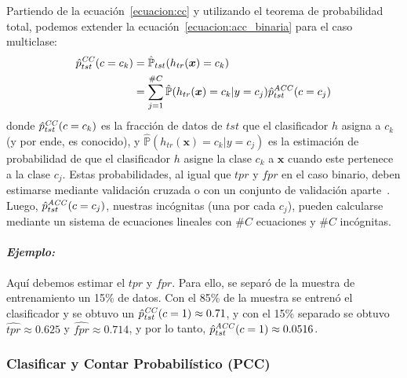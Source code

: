Partiendo de la ecuación~\ref{ecuacion:cc} y utilizando el teorema de
probabilidad total, podemos extender la ecuación~\ref{ecuacion:acc_binaria} para
el caso multiclase:
\begin{align}
\begin{split}
    \hat p^{\it CC\/}_{tst}(c=c_k) &= \mathbb{\hat P}_{tst}(h_{tr}(\boldsymbol{x})=c_k) \\
    &= \sum \limits_{j=1}^{\#C}{\mathbb{\hat P}(h_{tr}(\boldsymbol{x})=c_k|y=c_j) \hat p^{\it ACC\/}_{tst}(c=c_j)}\label{ecuacion:acc_multiclase}
\end{split}
\end{align}
donde \(\hat p^{\it CC\/}_{tst}(c=c_k)\) es la fracción de datos de \(tst\) que
el clasificador \(h\) asigna a \(c_k\) (y por ende, es conocido), y
\(\mathbb{\hat{P}}(h_{tr}(\boldsymbol{x})=c_k|y=c_j)\) es la estimación de
probabilidad de que el clasificador \(h\) asigne la clase \(c_k\) a
\(\boldsymbol{x}\) cuando este pertenece a la clase \(c_j\). Estas
probabilidades, al igual que \(tpr\) y \(fpr\) en el caso binario, deben
estimarse mediante validación cruzada o con un conjunto de validación
aparte~\cite{barranquero2013study, forman2005counting, forman2008quantifying}.
Luego, \(\hat p^{\it ACC\/}_{tst}(c=c_j)\), nuestras incógnitas (una por cada
\(c_j\)), pueden calcularse mediante un sistema de ecuaciones lineales con
\(\#C\) ecuaciones y \(\#C\) incógnitas.

\paragraph{\it Ejemplo:\/} Aquí debemos estimar el \(tpr\) y \(fpr\). Para ello,
se separó de la muestra de entrenamiento un 15\% de datos. Con el 85\% de la
muestra se entrenó el clasificador y se obtuvo un \(\hat p^{\it CC\/}_{tst}(c=1)
\approx 0.71\), y con el 15\% separado se obtuvo \(\hat{tpr} \approx 0.625\) y
\(\hat{fpr} \approx 0.714\), y por lo tanto, \(\hat p^{\it ACC\/}_{tst}(c=1)
\approx 0.0516\).

\subsubsection{Clasificar y Contar Probabilístico (PCC)}\label{estimacion:pcc}

